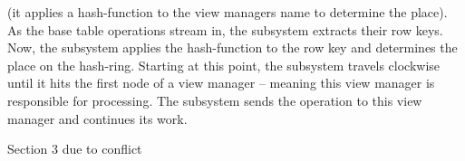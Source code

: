 %
%
%
%

(it applies a hash-function to the view managers name to determine the
place).  As the base table operations stream in, the subsystem
extracts their row keys. Now, the subsystem applies the hash-function
to the row key and determines the place on the hash-ring. Starting at
this point, the subsystem travels clockwise until it hits the first
node of a view manager -- meaning this view manager is responsible for
processing. The subsystem sends the operation to this view manager and
continues its work.


Section 3 due to conflict



%
%

